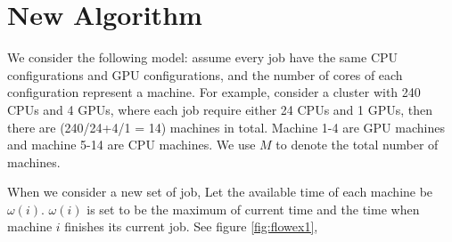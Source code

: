 \section{New Algorithm}

We consider the following model: assume every job have the same CPU configurations and GPU configurations, and the number of cores of each configuration represent a machine.  For example, consider a cluster with 240 CPUs and 4 GPUs, where each job require either 24 CPUs and 1 GPUs, then there are (240/24+4/1 = 14) machines in total. Machine 1-4 are GPU machines and machine 5-14 are CPU machines. We use $M$ to denote the total number of machines.

When we consider a new set of job, Let the available time of each machine be $\omega(i)$. $\omega(i)$ is set to be the maximum of current time and the time when machine $i$ finishes its current job. See figure \ref{fig:flowex1},









